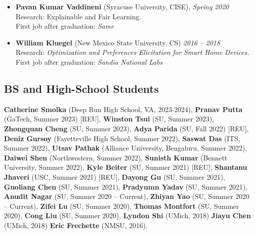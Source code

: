\begin{itemize}
  \item \textbf{Pavan Kumar Vaddineni}  ({\sc Syracuse University}, CISE), \hfill{\em Spring 2020}\\
  {\sc Research}: Explainable and Fair Learning.\\
  First job after graduation: \textit{Same}

  \item \textbf{William Kluegel} (New Mexico State University, CS) \hfill{\em 2016 -- 2018} \\
  {\sc Research}: \textit{Optimization and Preferences Elicitation for Smart Home Devices.}\\
  First job after graduation: \textit{Sandia National Labs}
\end{itemize}
\medskip

\subsection*{BS and High-School Students}
  \textbf{Catherine Smolka} (Deep Run High School, VA, 2023-2024), 
  \textbf{Pranav Putta} (GaTech, Summer 2023) [REU],
  \textbf{Winston Tsui} (SU, Summer 2023),
  \textbf{Zhongquan Cheng} (SU, Summer 2023), 
  \textbf{Adya Parida} (SU, Fall 2022) [REU], 
  \textbf{Deniz Gursoy} (Fayetteville High School, Summer 2022), 
  \textbf{Saswat Das} (ITS, Summer 2022), 
  \textbf{Utsav Pathak} (Alliance University, Bengaluru, Summer 2022),
  \textbf{Daiwei Shen} (Northwestern, Summer 2022),
  \textbf{Sunisth Kumar} (Bennett University, Summer 2022),
  \textbf{Kyle Beiter} (SU, Summer 2021) [REU],  %
  \textbf{Shantanu Jhaveri} (USC, Summer 2021) [REU], %
  \textbf{Dayong Gu} (SU, Summer 2021),
  \textbf{Guoliang Chen} (SU, Summer 2021),
  \textbf{Pradyumn Yadav} (SU, Summer 2021),
  \textbf{Anudit Nagar} (SU, Summer 2020 -- Current), 
  \textbf{Zhiyan Yao} (SU, Summer 2020 -- Current),
  \textbf{Zifei Lu} (SU, Summer 2020),
  \textbf{Thomas Montfort} (SU, Summer 2020),
  \textbf{Cong Liu} (SU, Summer 2020),
  \textbf{Lyndon Shi} (UMich, 2018)
  \textbf{Jiayu Chen} (UMich, 2018)
  \textbf{Eric Frechette} (NMSU, 2016).

\medskip

